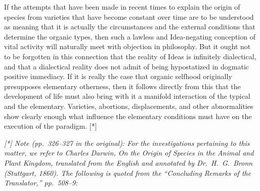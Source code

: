 \documentclass[12pt,a4paper]{article}
\begin{document}
If the attempts that have been made in recent times to explain the
origin of species from varieties that have become constant over
time are to be understood as meaning that it is actually the
circumstances and the external conditions that determine the
organic types, then such a lawless and Idea-negating conception of
vital activity will naturally meet with objection in philosophy.
But it ought not to be forgotten in this connection that the
reality of Ideas is infinitely dialectical, and that a dialectical
reality does not admit of being hypostatized in dogmatic positive
immediacy. If it is really the case that organic selfhood
originally presupposes elementary otherness, then it follows
directly from this that the development of life must also bring
with it a manifold interaction of the typical and the elementary.
Varieties, abortions, displacements, and other abnormalities show
clearly enough what influence the elementary conditions must have
on the execution of the paradigm. [*]

\medskip
\noindent\textit{[*] Note (pp.\ 326--327 in the original): For
the investigations pertaining to this matter, we refer to Charles
Darwin, \emph{On the Origin of Species in the Animal and Plant
Kingdom}, translated from the English and annotated by Dr.\ H.\
G.\ Bronn (Stuttgart, 1860). The following is quoted from the
``Concluding Remarks of the Translator,'' pp.\ 508--9:}
\end{document}
